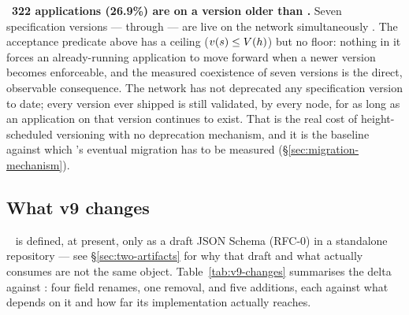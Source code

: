 \shipped\ \textbf{322 applications (26.9\%) are on a version older than .} Seven
specification versions —  through  — are live on the network simultaneously
. The acceptance predicate
above has a ceiling ($v(s) \le V(h)$) but no floor: nothing in it forces an already-running
application to move forward when a newer version becomes enforceable, and the measured coexistence
of seven versions is the direct, observable consequence. The network has not deprecated any
specification version to date; every version ever shipped is still validated, by every node, for as
long as an application on that version continues to exist. That is the real cost of
height-scheduled versioning with no deprecation mechanism, and it is the baseline against which
's eventual migration has to be measured (\S\ref{sec:migration-mechanism}).

\subsection{What v9 changes}

\inprogress\  is defined, at present, only as a draft JSON Schema (RFC-0) in a standalone
repository  — see \S\ref{sec:two-artifacts} for why that
draft and what \FluxOS actually consumes are not the same object. Table~\ref{tab:v9-changes}
summarises the delta against : four field renames, one removal, and five additions, each
against what depends on it and how far its implementation actually reaches.

